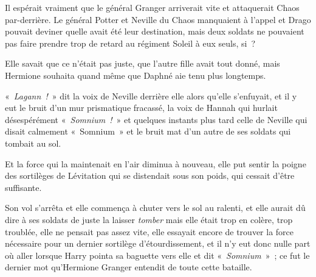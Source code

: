 Il espérait vraiment que le général Granger arriverait vite et attaquerait Chaos par-derrière.
Le général Potter et Neville du Chaos manquaient à l'appel et Drago pouvait deviner quelle avait été leur destination, mais deux soldats ne pouvaient pas faire prendre trop de retard au régiment Soleil à eux seuls, si~?

\later

Elle savait que ce n'était pas juste, que l'autre fille avait tout donné, mais Hermione souhaita quand même que Daphné aie tenu plus longtemps.

«~\emph{Lagann~!}~» dit la voix de Neville derrière elle alors qu'elle s'enfuyait, et il y eut le bruit d'un mur prismatique fracassé, la voix de Hannah qui hurlait désespérément «~\emph{Somnium~!}~» et quelques instants plus tard celle de Neville qui disait calmement «~Somnium~» et le bruit mat d'un autre de ses soldats qui tombait au sol.

Et la force qui la maintenait en l'air diminua à nouveau, elle put sentir la poigne des sortilèges de Lévitation qui se distendait sous son poids, qui cessait d'être suffisante.

Son vol s'arrêta et elle commença à chuter vers le sol au ralenti, et elle aurait dû dire à ses soldats de juste la laisser \emph{tomber} mais elle était trop en colère, trop troublée, elle ne pensait pas assez vite, elle essayait encore de trouver la force nécessaire pour un dernier sortilège d'étourdissement, et il n'y eut donc nulle part où aller lorsque Harry pointa sa baguette vers elle et dit «~\emph{Somnium}~»~; ce fut le dernier mot qu'Hermione Granger entendit de toute cette bataille.
